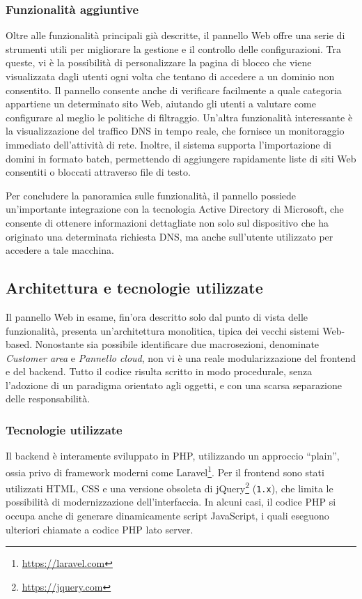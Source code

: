 \subsubsection{Funzionalità aggiuntive}
Oltre alle funzionalità principali già descritte, il pannello Web offre una serie di strumenti utili per migliorare la gestione e il controllo delle configurazioni. Tra queste, vi è la possibilità di personalizzare la pagina di blocco che viene visualizzata dagli utenti ogni volta che tentano di accedere a un dominio non consentito.
%
Il pannello consente anche di verificare facilmente a quale categoria appartiene un determinato sito Web, aiutando gli utenti a valutare come configurare al meglio le politiche di filtraggio.
%
Un’altra funzionalità interessante è la visualizzazione del traffico DNS in tempo reale, che fornisce un monitoraggio immediato dell’attività di rete. Inoltre, il sistema supporta l'importazione di domini in formato batch, permettendo di aggiungere rapidamente liste di siti Web consentiti o bloccati attraverso file di testo.

Per concludere la panoramica sulle funzionalità, il pannello possiede un'importante integrazione con la tecnologia Active Directory di Microsoft, che consente di ottenere informazioni dettagliate non solo sul dispositivo che ha originato una determinata richiesta DNS, ma anche sull’utente utilizzato per accedere a tale macchina.

\subsection{Architettura e tecnologie utilizzate}
Il pannello Web in esame, fin'ora descritto solo dal punto di vista delle funzionalità, presenta un'architettura monolitica, tipica dei vecchi sistemi Web-based. Nonostante sia possibile identificare due macrosezioni, denominate \textit{Customer area} e \textit{Pannello cloud}, non vi è una reale modularizzazione del frontend e del backend. Tutto il codice risulta scritto in modo procedurale, senza l’adozione di un paradigma orientato agli oggetti, e con una scarsa separazione delle responsabilità.

\subsubsection{Tecnologie utilizzate}
Il backend è interamente sviluppato in PHP, utilizzando un approccio ``plain'', ossia privo di framework moderni come Laravel\footnote{\url{https://laravel.com}}. Per il frontend sono stati utilizzati HTML, CSS e una versione obsoleta di jQuery\footnote{\url{https://jquery.com}} (\texttt{1.x}), che limita le possibilità di modernizzazione dell'interfaccia. In alcuni casi, il codice PHP si occupa anche di generare dinamicamente script JavaScript, i quali eseguono ulteriori chiamate a codice PHP lato server.


